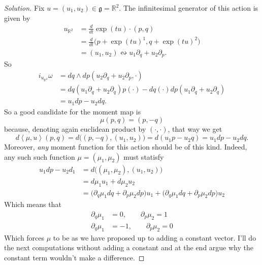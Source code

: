 \begin{proof}[Solution]\leavevmode
Fix $u=(u_1,u_2)\in \mathfrak{g}=\mathbb{R}^2$. The infinitesimal generator of this action is given by
\begin{align*}
u_{\mathbb{R}^2}&=\frac{d}{dt}\operatorname{exp}(tu)\cdot(p,q)\\&=\frac{d}{dt}\Big(p+\operatorname{exp}(tu)^1,q+\operatorname{exp}(tu)^2\Big)\\
&=(u_1,u_2)\leftrightsquigarrow u_1\partial_q+u_2\partial_p.
\end{align*}
So
\begin{align*}
i_{u_{\mathbb{R}^2}}\omega&=dq\wedge dp(u_2\partial_q+u_2\partial_p,\cdot)\\
&=dq(u_1\partial_q+u_2\partial_q)p(\cdot)-dq(\cdot)dp(u_1 \partial_q+u_2\partial_q)\\
&=u_1dp-u_2dq.
\end{align*}
So a good candidate for the moment map is
\[\mu(p,q)=(p,-q)\]
because, denoting again euclidean product by $(\cdot,\cdot)$, that way we get
\[d\left<\mu,u\right>(p,q)=d\Big((p,-q),(u_1,u_2)\Big)=d(u_1p-u_2q)=u_1dp-u_2dq.\]
Moreover, \textit{any} moment function for this action should be of this kind. Indeed, any such such function $\mu=(\mu_1,\mu_2)$ must statisfy
\begin{align*}
	u_1dp-u_2d_1&=d\Big((\mu_1,\mu_2),(u_1,u_2)\Big)\\
	&=d\mu_1u_1+d\mu_2u_2\\
	&=\Big(\partial_q\mu_1dq+\partial_p\mu_2 dp\Big)u_1+\Big(\partial_q\mu_1dq+\partial_p\mu_2dp\Big)u_2
\end{align*}
Which means that
\begin{align*}
\partial_q\mu_1&=0,\qquad \partial_p\mu_2=1\\
\partial_q\mu_1&=-1, \qquad \partial_p\mu_2=0
\end{align*}
Which forces $\mu$ to be as we have proposed up to adding a constant vector. I'll do the next computations without adding a constant and at the end argue why the constant term wouldn't make a difference.


\end{proof}
